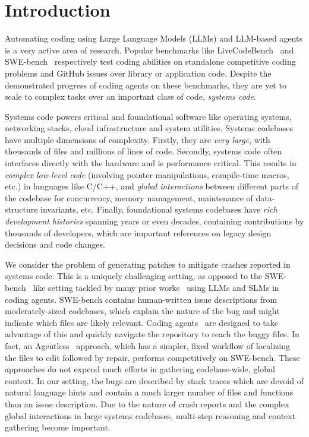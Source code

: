 \section{Introduction}%
\label{sec:intro}

Automating coding using Large Language Models (LLMs) and LLM-based agents is a very active area of research. Popular benchmarks like LiveCodeBench~\citep{jain2024livecodebench} and SWE-bench~\citep{jimenez2024swebench} respectively test coding abilities on standalone competitive coding problems and GitHub issues over library or application code. Despite the demonstrated progress of coding agents on these benchmarks, they are yet to scale to complex tasks over an important class of code, \textit{systems code}.

Systems code powers critical and foundational software like operating systems, networking stacks, cloud infrastructure and system utilities. Systems codebases have multiple dimensions of complexity.
Firstly, they are \emph{very large}, with thousands of files and millions of lines of code.
Secondly, systems code often interfaces directly with the hardware and is performance critical. This results in \emph{complex low-level code} (involving pointer manipulations, compile-time macros, etc.) in languages like C/C++, and \emph{global interactions} between different parts of the codebase for concurrency, memory management, maintenance of data-structure invariants, etc.
Finally, foundational systems codebases have \emph{rich development histories} spanning years or even decades, containing contributions by thousands of developers, which are important references on legacy design decisions and code changes.

We consider the problem of generating patches to mitigate crashes reported in systems code.
This is a uniquely challenging setting, as opposed to the SWE-bench~\citep{jimenez2024swebench} like setting tackled by many prior works~\citep{yang2024sweagentagentcomputerinterfacesenable,regym,repograph} using LLMs and SLMs in coding agents.
SWE-bench contains human-written issue descriptions from moderately-sized codebases, which explain the nature of the bug and might indicate which files are likely relevant.
Coding agents~\citep{yang2024sweagentagentcomputerinterfacesenable,openhands} are designed to take advantage of this and quickly navigate the repository to reach the buggy files. 
In fact, an Agentless~\citep{xia2024agentlessdemystifyingllmbasedsoftware} approach, which has a simpler, fixed workflow of localizing the files to edit followed by repair, performs competitively on SWE-bench.
These approaches do not expend much efforts in gathering codebase-wide, global context.
In our setting, the bugs are described by stack traces which are devoid of natural language hints and contain a much larger number of files and functions than an issue description.
Due to the nature of crash reports and the complex global interactions in large systems codebases, multi-step reasoning and context gathering become important.

